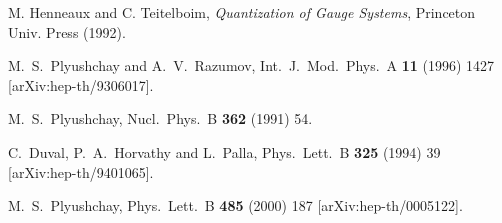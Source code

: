 \documentclass[a4paper,12pt]{article}
\begin{document}
\begin{thebibliography}{99}
M. Henneaux and C. Teitelboim,
{\it Quantization of Gauge Systems},
Princeton Univ. Press (1992).

M.~S.~Plyushchay and A.~V.~Razumov,
Int.\ J.\ Mod.\ Phys.\ A {\bf 11} (1996) 1427
[arXiv:hep-th/9306017].


M.~S.~Plyushchay,
Nucl.\ Phys.\ B {\bf 362} (1991) 54.


C.~Duval, P.~A.~Horvathy and L.~Palla,
Phys.\ Lett.\ B {\bf 325} (1994) 39
[arXiv:hep-th/9401065].


M.~S.~Plyushchay,
Phys.\ Lett.\ B {\bf 485} (2000) 187
[arXiv:hep-th/0005122].




\end{thebibliography}
\end{document}
